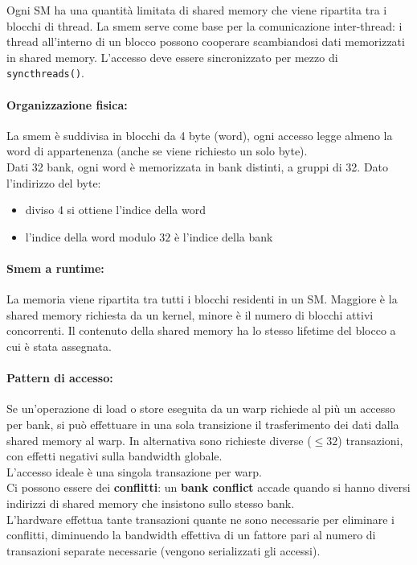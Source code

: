 Ogni SM ha una quantità limitata di shared memory che viene ripartita tra i blocchi di thread. La smem serve come base per la comunicazione inter-thread: i thread all'interno di un blocco possono cooperare scambiandosi dati memorizzati in shared memory. L'accesso deve essere sincronizzato per mezzo di \texttt{syncthreads()}.\\

\paragraph{Organizzazione fisica:} La smem è suddivisa in blocchi da 4 byte (word), ogni accesso legge almeno la word di appartenenza (anche se viene richiesto un solo byte).\\

Dati 32 bank, ogni word è memorizzata in bank distinti, a gruppi di 32. Dato l'indirizzo del byte: 
\begin{itemize}
	\item diviso 4 si ottiene l'indice della word
	\item l'indice della word modulo $32$ è l'indice della bank
\end{itemize}

\paragraph{Smem a runtime:} La memoria viene ripartita tra tutti i blocchi residenti in un SM. Maggiore è la shared memory richiesta da un kernel, minore è il numero di blocchi attivi concorrenti. Il contenuto della shared memory ha lo stesso lifetime del blocco a cui è stata assegnata.\\

\newpage

\paragraph{Pattern di accesso:} Se un'operazione di load o store eseguita da un warp richiede al più un accesso per bank, si può effettuare in una sola transizione il trasferimento dei dati dalla shared memory al warp. In alternativa sono richieste diverse ($\leq 32$) transazioni, con effetti negativi sulla bandwidth globale.\\

L'accesso ideale è una singola transazione per warp.\\

Ci possono essere dei \textbf{conflitti}: un \textbf{bank conflict} accade quando si hanno diversi indirizzi di shared memory che insistono sullo stesso bank.\\
L'hardware effettua tante transazioni quante ne sono necessarie per eliminare i conflitti, diminuendo la bandwidth effettiva di un fattore pari al numero di transazioni separate necessarie (vengono serializzati gli accessi).\\

